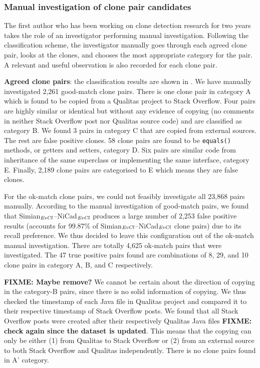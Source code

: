 \documentclass{sig-alternate-05-2015}
\newcommand\FIXME[1]{\textbf{FIXME: #1}}
\begin{document}
\subsubsection{Manual investigation of clone pair candidates}

The first author who has been working on clone detection research for two years takes the role of an investigator performing manual investigation. Following the classification scheme, the investigator manually goes through each agreed clone pair, looks at the clones, and chooses the most appropriate category for the pair. A relevant and useful observation is also recorded for each clone pair. 

\textbf{Agreed clone pairs}: the classification results are shown in . We have manually investigated 2,261 good-match clone pairs. There is one clone pair in category A which is found to be copied from a Qualitas project to Stack Overflow. Four pairs are highly similar or identical but without any evidence of copying (no comments in neither Stack Overflow post nor Qualitas source code) and are classified as category B. We found 3 pairs in category C that are copied from external sources. The rest are false positive clones. 58 clone pairs are found to be \verb|equals()| methods, or getters and setters, category D. Six pairs are similar code from inheritance of the same superclass or implementing the same interface, category E. Finally, 2,189 clone pairs are categorised to E which means they are false clones.

For the ok-match clone pairs, we could not feasibly investigate all 23,868 pairs manually.  According to the manual investigation of good-match pairs, we found that Simian$_{\textrm{\textit{EvCl}}}$--NiCad$_{\textrm{\textit{EvCl}}}$ produces a large number of 2,253 false positive results (accounts for 99.87\% of Simian$_{\textrm{\textit{EvCl}}}$--NiCad$_{\textrm{\textit{EvCl}}}$ clone pairs) due to its recall preference. We thus decided to leave this configuration out of the ok-match manual investigation. There are totally 4,625 ok-match pairs that were investigated. The 47 true positive pairs found are combinations of 8, 29, and 10 clone pairs in category A, B, and C respectively.

\FIXME{Maybe remove?} We cannot be certain about the direction of copying in the category-B pairs, since there is no solid information of copying. We thus checked the timestamp of each Java file in Qualitas project and compared it to their respective timestamp of Stack Overflow posts. We found that all Stack Overflow posts were created after their respectively Qualitas Java files \FIXME{check again since the dataset is updated}. This means that the copying can only be either (1) from Qualitas to Stack Overflow or (2) from an external source to both Stack Overflow and Qualitas independently. There is no clone pairs found in A' category.
\end{document}
